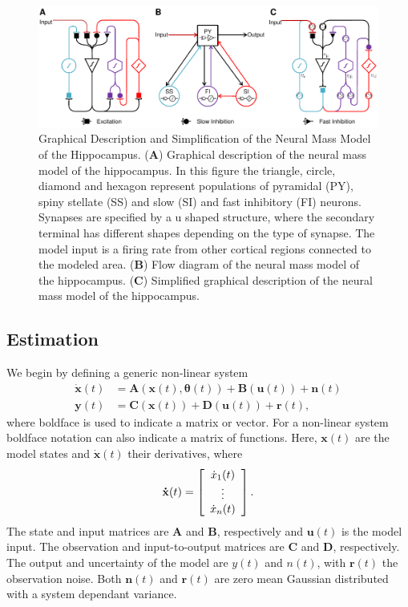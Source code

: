  \begin{figure}
 	\centering
 		\includegraphics{fig/Biological_Model.pdf}
 	\caption{Graphical Description and Simplification of the Neural Mass Model of the Hippocampus. (\textbf{A}) Graphical description of the neural mass model of the hippocampus. In this figure the triangle, circle, diamond and hexagon represent populations of pyramidal (PY), spiny stellate (SS) and slow (SI) and fast inhibitory (FI) neurons. Synapses are specified by a u shaped structure, where the secondary terminal has different shapes depending on the type of synapse. The model input is a firing rate from other cortical regions connected to the modeled area. (\textbf{B}) Flow diagram of the neural mass model of the hippocampus. (\textbf{C}) Simplified graphical description of the neural mass model of the hippocampus.}
 	\label{fig: Biological}
 \end{figure}


\subsection{Estimation}


We begin by defining a generic non-linear system\begin{align}
\label{eqn: NonlinEstS}
\mathbf{\dot{x}}(t) &= \mathbf{A}(\mathbf{x}(t),\mathbf{\theta}(t)) + \mathbf{B}(\mathbf{u}(t)) + \mathbf{n}(t)\\
\label{eqn: NonlinEstO}
\mathbf{y}(t)  &= \mathbf{C}(\mathbf{x}(t)) +\mathbf{D}(\mathbf{u}(t))+\mathbf{r}(t),
\end{align} where boldface is used to indicate a matrix or vector. For a non-linear system boldface notation can also indicate a matrix of functions. Here, $\mathbf{x}(t)$ are the model states and $\dot{\mathbf{x}}(t)$ their derivatives, where
\[ \mathbf{\dot{x}}(t) = \left[ \begin{array}[pos]{c}
\dot{x}_{1}(t)\\
\vdots \\
\dot{x}_{n}(t) \end{array} \right] .\] The state and input matrices are $\mathbf{A}$ and $\mathbf{B}$, respectively and $\mathbf{u}(t)$ is the model input. The observation and input-to-output matrices are $\mathbf{C}$ and $\mathbf{D}$, respectively. The output and uncertainty of the model are $y(t)$ and $n(t)$, with $\mathbf{r}(t)$ the observation noise. Both $\mathbf{n}(t)$ and $\mathbf{r}(t)$ are zero mean Gaussian distributed with a system dependant variance. 


